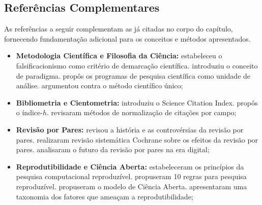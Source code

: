 
\subsection{Referências Complementares}
\label{sec:refs_complementares}

As referências a seguir complementam as já citadas no corpo do
capítulo, fornecendo fundamentação adicional para os conceitos e
métodos apresentados.

\begin{itemize}
    \item \textbf{Metodologia Científica e Filosofia da Ciência:}
     estabeleceu o falsificacionismo
    como critério de demarcação científica.
     introduziu o conceito de paradigma.
     propôs os programas de pesquisa
    científica como unidade de análise.
     argumentou contra o método
    científico único;

    \item \textbf{Bibliometria e Cientometria:}
     introduziu o Science
    Citation Index.  propôs o
    índice-$h$.  revisaram
    métodos de normalização de citações por campo;

    \item \textbf{Revisão por Pares:}
     revisou a história e as
    controvérsias da revisão por pares.
     realizaram revisão
    sistemática Cochrane sobre os efeitos da revisão por pares.
     analisaram o futuro da
    revisão por pares na era digital;

    \item \textbf{Reprodutibilidade e Ciência Aberta:}
     estabeleceram os
    princípios da pesquisa computacional reproduzível.
     propuseram 10 regras para
    pesquisa reproduzível. 
    propuseram o modelo de Ciência Aberta.
     apresentaram uma
    taxonomia dos fatores que ameaçam a reprodutibilidade;


\end{itemize}
